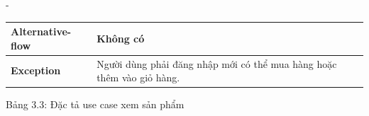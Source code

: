 \begin {list} {-}{}
\begin{itemize}
\begin{table}[h]
\begin{tabular}{|l|l|}
        \textbf{Alternative-flow} & Không có                                                                                                                                                                                                                                                                                                                                                                                                                                                                                                                                                                                                                                                                                                                                                                                                        \\ \hline
        \textbf{Exception}        & Người dùng phải đăng nhập mới có thể mua hàng hoặc thêm vào giỏ hàng.                                                                                                                                                                                                                                                                                                                                                                                                                                                                                                                                                                                                                                                                                                                                                                                                        \\ \hline
        \end{tabular}
        \begin{center}
            Bảng 3.3: Đặc tả use case xem sản phẩm
        \end{center}
        \end{table}
        

\end{itemize}
\end{list}
